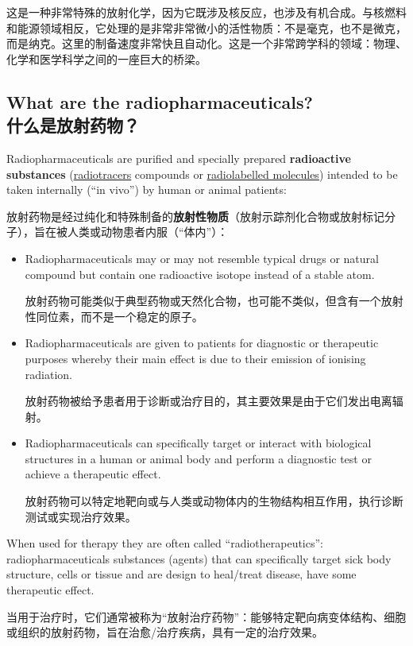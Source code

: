 \documentclass[dvipsnames, svgnames,a4paper,11pt]{article}
\begin{document}
这是一种非常特殊的放射化学，因为它既涉及核反应，也涉及有机合成。与核燃料和能源领域相反，它处理的是非常非常微小的活性物质：不是毫克，也不是微克，而是纳克。这里的制备速度非常快且自动化。这是一个非常跨学科的领域：物理、化学和医学科学之间的一座巨大的桥梁。

\subsection{What are the radiopharmaceuticals?\\什么是放射药物？}

Radiopharmaceuticals are purified and specially prepared \textbf{radioactive substances} (\underline{radiotracers} compounds or \underline{radiolabelled molecules}) intended to be taken internally (“in vivo”) by human or animal patients:

放射药物是经过纯化和特殊制备的\textbf{放射性物质}（放射示踪剂化合物或放射标记分子），旨在被人类或动物患者内服（“体内”）：
\begin{itemize}
      \item Radiopharmaceuticals may or may not resemble typical drugs or natural compound but contain one radioactive isotope instead of a stable atom.

            放射药物可能类似于典型药物或天然化合物，也可能不类似，但含有一个放射性同位素，而不是一个稳定的原子。

      \item Radiopharmaceuticals are given to patients for diagnostic or therapeutic purposes whereby their main effect is due to their emission of ionising radiation.

            放射药物被给予患者用于诊断或治疗目的，其主要效果是由于它们发出电离辐射。
      \item Radiopharmaceuticals can specifically target or interact with biological structures in a human or animal body and perform a diagnostic test or achieve a therapeutic effect.

            放射药物可以特定地靶向或与人类或动物体内的生物结构相互作用，执行诊断测试或实现治疗效果。
\end{itemize}

When used for therapy they are often called “radiotherapeutics”: radiopharmaceuticals substances (agents) that can specifically target sick body structure, cells or tissue and are design to heal/treat disease, have some therapeutic effect.

当用于治疗时，它们通常被称为“放射治疗药物”：能够特定靶向病变体结构、细胞或组织的放射药物，旨在治愈/治疗疾病，具有一定的治疗效果。
\end{document}
